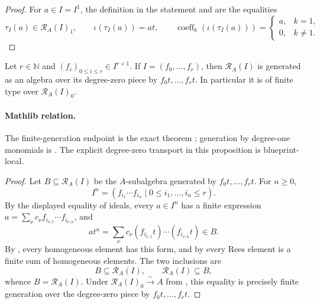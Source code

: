 \begin{proof}
  For $a\in I=I^1$, the definition in the statement and
   are the equalities
  \[
    \tau_I(a)\in\mathcal R_A(I)_1,
    \qquad
    \iota(\tau_I(a))=at,
    \qquad
    \operatorname{coeff}_k(\iota(\tau_I(a)))
      =\begin{cases}a,&k=1,\\0,&k\ne1.
        \end{cases}
  \]
\end{proof}

\begin{proposition}
  \label{prop:nagata-rees-finite-generation}

  Let $r\in\mathbb N$ and $(f_i)_{0\leq i\leq r}\in I^{r+1}$.  If
  $I=(f_0,\ldots,f_r)$, then $\mathcal R_A(I)$ is generated as an algebra
  over its degree-zero piece by $f_0t,\ldots,f_rt$.  In particular it is of
  finite type over $\mathcal R_A(I)_0$.

  \paragraph{Mathlib relation.}
  The finite-generation endpoint is the exact theorem
  \texttt{}; generation by degree-one monomials
  is \texttt{}.  The explicit
  degree-zero transport in this proposition is blueprint-local.
\end{proposition}

\begin{proof}
  Let $B\subseteq\mathcal R_A(I)$ be the $A$-subalgebra generated by
  $f_0t,\ldots,f_rt$.  For $n\ge0$,
  \[
    I^n=(f_{i_1}\cdots f_{i_n}\mid
       0\le i_1,\ldots,i_n\le r).
  \]
  By the displayed equality of ideals, every $a\in I^n$ has a finite
  expression
  $a=\sum_\nu c_\nu f_{i_{\nu,1}}\cdots f_{i_{\nu,n}}$, and
  \[
    at^n
      =\sum_\nu c_\nu
        (f_{i_{\nu,1}}t)\cdots(f_{i_{\nu,n}}t)\in B.
  \]
  By , every homogeneous element has
  this form, and by  every Rees
  element is a finite sum of homogeneous elements.  The two inclusions are
  \[
    B\subseteq\mathcal R_A(I),\qquad
    \mathcal R_A(I)\subseteq B,
  \]
  whence $B=\mathcal R_A(I)$.  Under
  $\mathcal R_A(I)_0\xrightarrow{\sim}A$ from
  , this equality is precisely finite
  generation over the degree-zero piece by $f_0t,\ldots,f_rt$.
\end{proof}

